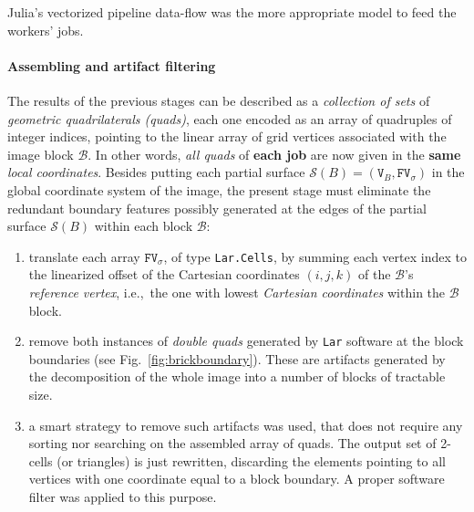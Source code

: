 Julia's vectorized pipeline data-flow was 
the more appropriate model to feed the workers' jobs.

\paragraph{Assembling and artifact filtering}\label{sec:artifact-filtering}
The results of the previous stages can be described as a \emph{collection of sets} of \emph{geometric quadrilaterals (quads)}, each one encoded as an array of quadruples of integer indices, pointing to the linear array of grid vertices associated with the image block $\mathcal{B}$.  In other words, \emph{all quads} of \textbf{each job} are now given in the \textbf{same} \emph{local coordinates}.  Besides putting each partial surface $\mathcal{S}(B) = (\texttt{V}_B, \texttt{FV}_\sigma)$ in the global coordinate system of the image, the present stage must eliminate the redundant boundary features possibly generated at the edges of the partial surface $\mathcal{S}(B)$ within each block $\mathcal{B}$:

\begin{enumerate}

\item translate each array $\mathtt{FV}_\sigma$, of type \texttt{Lar.Cells}, by summing each vertex index to the linearized offset of the Cartesian coordinates $(i,j,k)$ of the $\mathcal{B}$'s \emph{reference vertex}, i.e.,~the one with lowest \emph{Cartesian coordinates} within the $\mathcal{B}$ block.

\item remove both instances of \emph{double quads} generated by \texttt{Lar} software at the block boundaries 
(see Fig.~\ref{fig:brickboundary}). 
These are artifacts generated by the decomposition of the whole image into a number of blocks of tractable size.

\item 
a smart strategy to remove such artifacts was used, that does not require any sorting nor searching on the assembled array of quads. The output set of 2-cells (or triangles) is just rewritten, discarding the elements pointing to all vertices with one coordinate equal to a block boundary. A proper software filter was applied to this purpose.

\end{enumerate}

